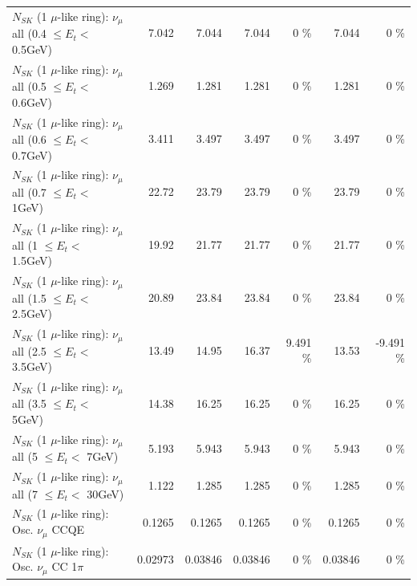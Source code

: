 \begin{table}
\begin{tabular}{| l | r | r | r  r | r  r |}
       $N_{SK}$ (1 $\mu$-like ring): $\nu_{\mu}$ all (0.4 $\leq E_{t} <$ 0.5GeV) &           7.042 &           7.044 &           7.044 &        0 \%  &           7.044 &        0 \%  \\ 
       $N_{SK}$ (1 $\mu$-like ring): $\nu_{\mu}$ all (0.5 $\leq E_{t} <$ 0.6GeV) &           1.269 &           1.281 &           1.281 &        0 \%  &           1.281 &        0 \%  \\ 
       $N_{SK}$ (1 $\mu$-like ring): $\nu_{\mu}$ all (0.6 $\leq E_{t} <$ 0.7GeV) &           3.411 &           3.497 &           3.497 &        0 \%  &           3.497 &        0 \%  \\ 
         $N_{SK}$ (1 $\mu$-like ring): $\nu_{\mu}$ all (0.7 $\leq E_{t} <$ 1GeV) &           22.72 &           23.79 &           23.79 &        0 \%  &           23.79 &        0 \%  \\ 
         $N_{SK}$ (1 $\mu$-like ring): $\nu_{\mu}$ all (1 $\leq E_{t} <$ 1.5GeV) &           19.92 &           21.77 &           21.77 &        0 \%  &           21.77 &        0 \%  \\ 
       $N_{SK}$ (1 $\mu$-like ring): $\nu_{\mu}$ all (1.5 $\leq E_{t} <$ 2.5GeV) &           20.89 &           23.84 &           23.84 &        0 \%  &           23.84 &        0 \%  \\ 
       $N_{SK}$ (1 $\mu$-like ring): $\nu_{\mu}$ all (2.5 $\leq E_{t} <$ 3.5GeV) &           13.49 &           14.95 &           16.37 &    9.491 \%  &           13.53 &   -9.491 \%  \\ 
         $N_{SK}$ (1 $\mu$-like ring): $\nu_{\mu}$ all (3.5 $\leq E_{t} <$ 5GeV) &           14.38 &           16.25 &           16.25 &        0 \%  &           16.25 &        0 \%  \\ 
           $N_{SK}$ (1 $\mu$-like ring): $\nu_{\mu}$ all (5 $\leq E_{t} <$ 7GeV) &           5.193 &           5.943 &           5.943 &        0 \%  &           5.943 &        0 \%  \\ 
          $N_{SK}$ (1 $\mu$-like ring): $\nu_{\mu}$ all (7 $\leq E_{t} <$ 30GeV) &           1.122 &           1.285 &           1.285 &        0 \%  &           1.285 &        0 \%  \\ 
\hline
\hline
                               $N_{SK}$ (1 $\mu$-like ring): Osc. $\nu_\mu$ CCQE &          0.1265 &          0.1265 &          0.1265 &        0 \%  &          0.1265 &        0 \%  \\ 
                          $N_{SK}$ (1 $\mu$-like ring): Osc. $\nu_\mu$ CC 1$\pi$ &         0.02973 &         0.03846 &         0.03846 &        0 \%  &         0.03846 &        0 \%  \\ 

\end{tabular}
\end{table}

